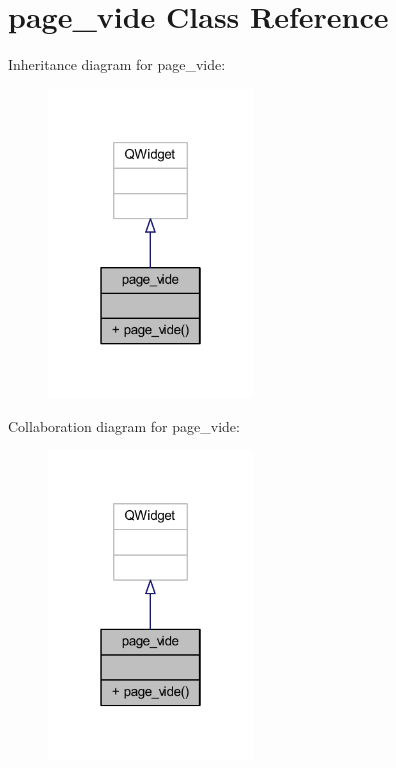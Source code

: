 \hypertarget{classpage__vide}{}\section{page\+\_\+vide Class Reference}
\label{classpage__vide}


Inheritance diagram for page\+\_\+vide\+:\nopagebreak
\begin{figure}[H]
\begin{center}
\leavevmode
\includegraphics[width=154pt]{classpage__vide__inherit__graph}
\end{center}
\end{figure}


Collaboration diagram for page\+\_\+vide\+:\nopagebreak
\begin{figure}[H]
\begin{center}
\leavevmode
\includegraphics[width=154pt]{classpage__vide__coll__graph}
\end{center}
\end{figure}
